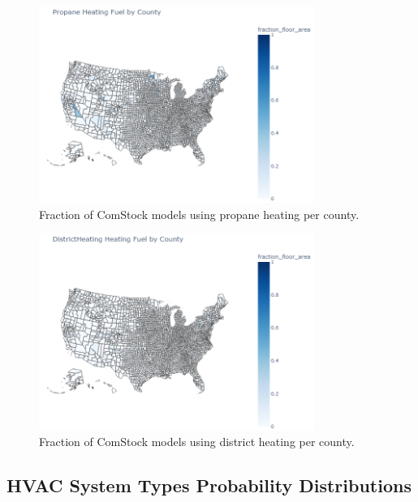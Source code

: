\begin{figure}
  \centering
  \includegraphics[width=0.8\textwidth]{figures/map_propane.png}
  \caption[Fraction of ComStock models using propane heating/water heating per county]{Fraction of ComStock models using propane heating per county.}
  \label{fig:map_propane}
\end{figure}

\begin{figure}
  \centering
  \includegraphics[width=0.8\textwidth]{figures/map_districtheating.png}
  \caption[Fraction of ComStock models using district heating/water heating per county]{Fraction of ComStock models using district heating per county.}
  \label{fig:map_district}
\end{figure}




\vspace{5mm}
\subsection{HVAC System Types Probability Distributions}
\label{sec:HVAC_System_Type}

